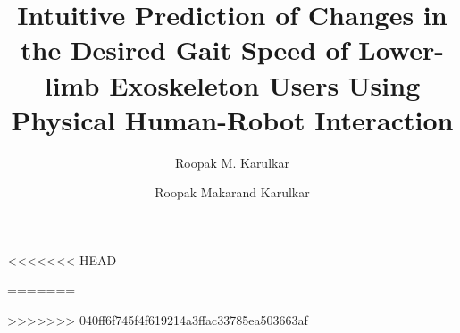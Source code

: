 




	
	\frontmatter             %
	
	\title{ Intuitive Prediction of Changes in the Desired Gait Speed of Lower-limb Exoskeleton Users Using Physical Human-Robot Interaction}  %
	
<<<<<<< HEAD
	\author{Roopak M. Karulkar}      %
=======
	\author{ Roopak Makarand Karulkar }      %
>>>>>>> 040ff6f745f4f619214a3ffac33785ea503663af
	
	\maketitle               %
	
	 \makecopyright        %
	
	
	 
	
